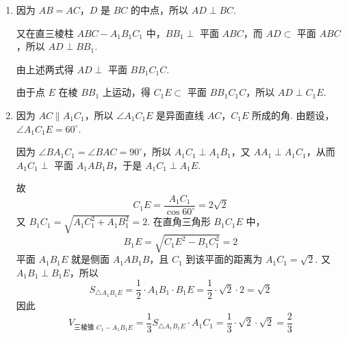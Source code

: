 \begin{solution}
\begin{enumerate}
\item 因为 \(AB=AC\)，\(D\) 是 \(BC\) 的中点，所以 \(AD\perp BC\).

又在直三棱柱 \(ABC-A_{1}B_{1}C_{1}\) 中，\(BB_{1}\perp\) 平面 \(ABC\)，而 \(AD\subset\) 平面 \(ABC\)，所以 \(AD\perp BB_{1}\).

由上述两式得 \(AD\perp\) 平面 \(BB_{1}C_{1}C\).

由于点 \(E\) 在棱 \(BB_{1}\) 上运动，得 \(C_{1}E\subset\) 平面 \(BB_{1}C_{1}C\)，所以 \(AD\perp C_{1}E\).

\item 因为 \(AC\parallel A_{1}C_{1}\)，所以 \(\angle A_{1}C_{1}E\) 是异面直线 \(AC\)，\(C_{1}E\) 所成的角. 由题设，\(\angle A_{1}C_{1}E=60^{\circ}\).

因为 \(\angle BA_{1}C_{1}=\angle BAC=90^{\circ}\)，所以 \(A_{1}C_{1}\perp A_{1}B_{1}\)，又 \(AA_{1}\perp A_{1}C_{1}\)，从而 \(A_{1}C_{1}\perp\) 平面 \(A_{1}AB_{1}B\)，于是 \(A_{1}C_{1}\perp A_{1}E\).

故
\[
C_{1}E=\frac{A_{1}C_{1}}{\cos60^{\circ}}=2\sqrt{2}
\]
又 \(B_{1}C_{1}=\sqrt{A_{1}C_{1}^{2}+A_{1}B_{1}^{2}}=2\).
在直角三角形 \(B_{1}C_{1}E\) 中，
\[
B_{1}E=\sqrt{C_{1}E^{2}-B_{1}C_{1}^{2}}=2
\]
平面 \(A_{1}B_{1}E\) 就是侧面 \(A_{1}AB_{1}B\)，且 \(C_{1}\) 到该平面的距离为 \(A_{1}C_{1}=\sqrt{2}\). 又 \(A_{1}B_{1}\perp B_{1}E\)，所以
\[
S_{\triangle A_{1}B_{1}E}=\frac{1}{2}\cdot A_{1}B_{1}\cdot B_{1}E=\frac{1}{2}\cdot\sqrt{2}\cdot2=\sqrt{2}
\]
因此
\[
V_{\text{三棱锥 }C_{1}-A_{1}B_{1}E}
=\frac{1}{3}S_{\triangle A_{1}B_{1}E}\cdot A_{1}C_{1}
=\frac{1}{3}\cdot\sqrt{2}\cdot\sqrt{2}
=\frac{2}{3}
\]
\end{enumerate}
\end{solution}

